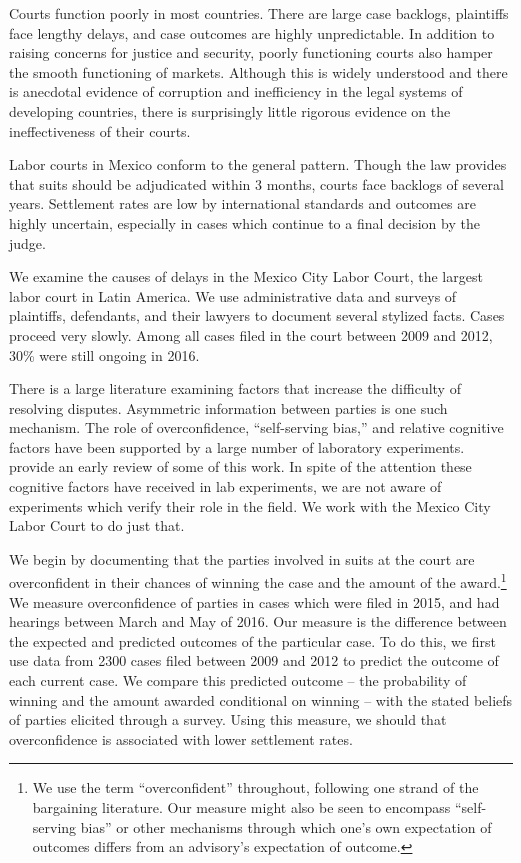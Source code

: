 \documentclass[11pt]{article}
\begin{document}
Courts  function poorly in most countries. There are large case backlogs, plaintiffs face lengthy delays, and case outcomes are highly unpredictable. In addition to raising concerns for justice and security, poorly functioning courts also hamper the smooth functioning of markets. Although this is widely understood and there is anecdotal evidence of corruption and inefficiency in the legal systems of developing countries, there is surprisingly little rigorous evidence on the ineffectiveness of their courts.
    
   Labor courts in Mexico conform to the general pattern. Though the law provides that suits should be adjudicated within 3 months, courts face backlogs of several years. Settlement rates are low by international standards and outcomes are highly uncertain, especially in cases which continue to a final decision by the judge. 

We examine the causes of delays in the Mexico City Labor Court, the largest labor court in Latin America. We use administrative data and surveys of plaintiffs, defendants, and their lawyers to document several stylized facts. Cases proceed very slowly. Among all cases filed in the court between 2009 and 2012, 30\% were still ongoing in 2016.  

There is a large literature examining factors that increase the difficulty of resolving disputes. Asymmetric information between parties is one such mechanism. The role of overconfidence, “self-serving bias,” and relative cognitive factors have been supported by a large number of laboratory experiments. \cite{BabcockLoewensein_BargainingImpasse}  provide an early review of some of this work. In spite of the attention these cognitive factors have received in lab experiments, we are not aware of experiments which verify their role in the field.  We work with the Mexico City Labor Court to do just that.

We begin by documenting that the parties involved in suits at the court are overconfident in their chances of winning the case and the amount of the award.\footnote{We use the term “overconfident” throughout, following one strand of the bargaining literature. Our measure might also be seen to encompass “self-serving bias” \cite{BabcockLoewensein_BargainingImpasse} or other mechanisms through which one’s own expectation of outcomes differs from an advisory’s expectation of outcome.}  We measure overconfidence of parties in cases which were filed in 2015, and had hearings between March and May of 2016. Our measure is the difference between the expected and predicted outcomes of the particular case. To do this, we first use data from 2300 cases filed between 2009 and 2012 to predict the outcome of each current case. We compare this predicted outcome – the probability of winning and the amount awarded conditional on winning – with the stated beliefs of parties elicited through a survey. Using this measure, we should that overconfidence is associated with lower settlement rates.
\end{document}
